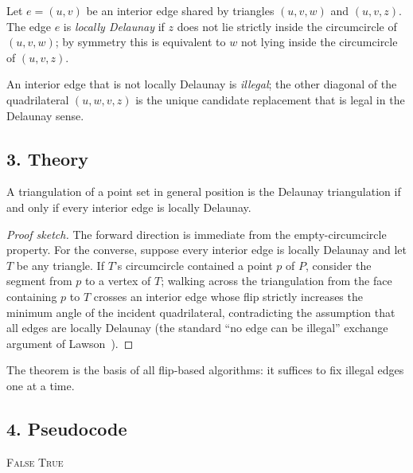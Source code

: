 \begin{definition}\label{def:locally_delaunay}
Let $e = (u,v)$ be an interior edge shared by triangles $(u,v,w)$ and $(u,v,z)$.
The edge $e$ is \emph{locally Delaunay} if $z$ does not lie strictly inside the
circumcircle of $(u,v,w)$; by symmetry this is equivalent to $w$ not lying
inside the circumcircle of $(u,v,z)$.
\end{definition}

\begin{definition}\label{def:delaunay_illegal_edge}
An interior edge that is not locally Delaunay is \emph{illegal}; the other
diagonal of the quadrilateral $(u,w,v,z)$ is the unique candidate replacement
that is legal in the Delaunay sense.
\end{definition}

\subsection{3. Theory}

\begin{theorem}\label{thm:local_global}
A triangulation of a point set in general position is the Delaunay triangulation
if and only if every interior edge is locally Delaunay.
\end{theorem}

\begin{proof}[Proof sketch]
The forward direction is immediate from the empty-circumcircle property.
For the converse, suppose every interior edge is locally Delaunay and let $T$ be
any triangle. If $T$'s circumcircle contained a point $p$ of $P$, consider the
segment from $p$ to a vertex of $T$; walking across the triangulation from the
face containing $p$ to $T$ crosses an interior edge whose flip strictly
increases the minimum angle of the incident quadrilateral, contradicting the
assumption that all edges are locally Delaunay (the standard ``no edge can be
illegal'' exchange argument of Lawson~\cite{lawson1977}).
\end{proof}

The theorem is the basis of all flip-based algorithms: it suffices to fix
illegal edges one at a time.

\subsection{4. Pseudocode}

\begin{algorithm}[htbp]
\caption{Local Delaunay Test}
\label{alg:local_delaunay}
\begin{algorithmic}[1]
    \State \Return \textsc{False} 
  \EndIf
  \State \Return \textsc{True}
\EndFunction
\end{algorithmic}
\end{algorithm}

